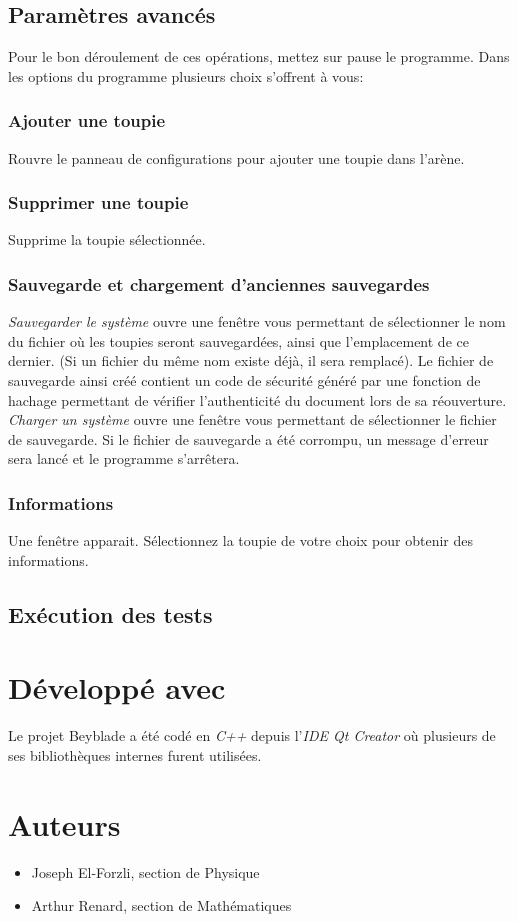\documentclass[a4paper]{article}%
\begin{document}
	\subsection {Paramètres avancés}
		Pour le bon déroulement de ces opérations, mettez sur pause le programme.
		Dans les options du programme plusieurs choix s'offrent à vous:
		\subsubsection {Ajouter une toupie}
			Rouvre le panneau de configurations pour ajouter une toupie dans l'arène. 
		\subsubsection {Supprimer une toupie}
			Supprime la toupie sélectionnée.
		\subsubsection {Sauvegarde et chargement d'anciennes sauvegardes}
			\emph {Sauvegarder le système} ouvre une fenêtre vous permettant de sélectionner le nom du fichier où les toupies seront sauvegardées, ainsi que l'emplacement de ce dernier. (Si un fichier du même nom existe déjà, il sera remplacé). 
			Le fichier de sauvegarde ainsi créé contient un code de sécurité généré par une fonction de hachage permettant de vérifier l'authenticité du document lors de sa réouverture. \\
			
			\emph {Charger un système} ouvre une fenêtre vous permettant de sélectionner le fichier de sauvegarde. Si le fichier de sauvegarde a été corrompu, un message d'erreur sera lancé et le programme s'arrêtera.
		\subsubsection {Informations}
			Une fenêtre apparait. Sélectionnez la toupie de votre choix pour obtenir des informations.
	\subsection {Exécution des tests}
\section{Développé avec}
	Le projet Beyblade a été codé en \emph{C++}  depuis l'\emph{IDE Qt Creator} où plusieurs de ses bibliothèques internes furent utilisées.
	
\section {Auteurs}
	\begin{itemize}
		\item Joseph El-Forzli, section de Physique
		\item Arthur Renard, section de Mathématiques
	\end{itemize}
\end{document}
